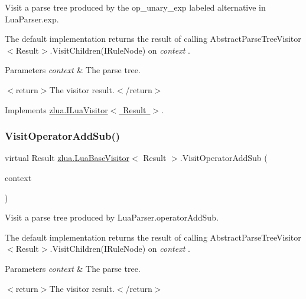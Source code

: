 Visit a parse tree produced by the {\ttfamily op\+\_\+unary\+\_\+exp} labeled alternative in Lua\+Parser.\+exp. 

The default implementation returns the result of calling Abstract\+Parse\+Tree\+Visitor$<$\+Result$>$.\+Visit\+Children(\+I\+Rule\+Node) on {\itshape context} . 


\begin{DoxyParams}{Parameters}
{\em context} & The parse tree.\\
\hline
\end{DoxyParams}
$<$return$>$The visitor result.$<$/return$>$ 

Implements \mbox{\hyperlink{interfacezlua_1_1_i_lua_visitor_a492c5985ab1023b73ab337f585308f67}{zlua.\+I\+Lua\+Visitor$<$ Result $>$}}.

\mbox{\label{classzlua_1_1_lua_base_visitor_ac4ab12c3ec18948f72f8f04ba0df85dd}} 
\subsubsection{\texorpdfstring{Visit\+Operator\+Add\+Sub()}{VisitOperatorAddSub()}}
{\footnotesize\ttfamily virtual Result \mbox{\hyperlink{classzlua_1_1_lua_base_visitor}{zlua.\+Lua\+Base\+Visitor}}$<$ Result $>$.Visit\+Operator\+Add\+Sub (\begin{DoxyParamCaption}\item[{\mbox{[}\+Not\+Null\mbox{]} \mbox{\hyperlink{classzlua_1_1_lua_parser_1_1_operator_add_sub_context}{Lua\+Parser.\+Operator\+Add\+Sub\+Context}}}]{context }\end{DoxyParamCaption})\hspace{0.3cm}{\ttfamily [virtual]}}



Visit a parse tree produced by Lua\+Parser.\+operator\+Add\+Sub. 

The default implementation returns the result of calling Abstract\+Parse\+Tree\+Visitor$<$\+Result$>$.\+Visit\+Children(\+I\+Rule\+Node) on {\itshape context} . 


\begin{DoxyParams}{Parameters}
{\em context} & The parse tree.\\
\hline
\end{DoxyParams}
$<$return$>$The visitor result.$<$/return$>$ 


